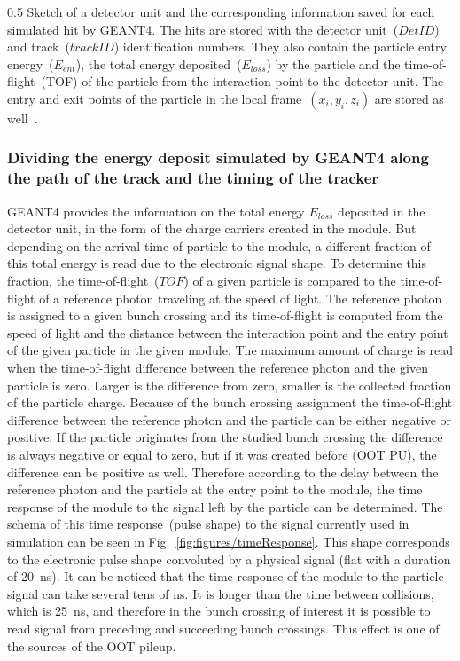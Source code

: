                  {0.5}       %
                 { Sketch of a detector unit and the corresponding information saved for each simulated hit by GEANT4. The hits are stored with the detector unit~($DetID$) and track~($trackID$) identification numbers. They also contain the particle entry energy~($E_{ent}$), the total energy deposited~($E_{loss}$) by the particle and the time-of-flight~(TOF) of the particle from the interaction point to the detector unit. The entry and exit points of the particle in the local frame~$(x_{i},y_{i},z_{i})$ are stored as well~\cite{website:simuBasics}. }

\subsubsection{Dividing the energy deposit simulated by GEANT4 along the path of the track and the timing of the tracker~\label{sec:divide}}

GEANT4 provides the information on the total energy $E_{loss}$ deposited in the detector unit, in the form of the charge carriers created in the module. But depending on the arrival time of particle to the module, a different fraction of this total energy is read due to the electronic signal shape. To determine this fraction, the time-of-flight~($TOF$) of a given particle is compared to the time-of-flight of a reference photon traveling at the speed of light. The reference photon is assigned to a given bunch crossing and its time-of-flight is computed from the speed of light and the distance between the interaction point and the entry point of the given particle in the given module. The maximum amount of charge is read when the time-of-flight difference between the reference photon and the given particle is zero. Larger is the difference from zero, smaller is the collected fraction of the particle charge. Because of the bunch crossing assignment the time-of-flight difference between the reference photon and the particle can be either negative or positive. If the particle originates from the studied bunch crossing the difference is always negative or equal to zero, but if it was created before (OOT PU), the difference can be positive as well. Therefore according to the delay between the reference photon and the particle at the entry point to the module, the time response of the module to the signal left by the particle can be determined. The schema of this time response~(pulse shape) to the signal currently used in simulation can be seen in Fig.~\ref{fig:figures/timeResponse}. This shape corresponds to the electronic pulse shape convoluted by a physical signal (flat with a duration  of 20~ns). It can be noticed that the time response of the module to the particle signal can take several tens of ns. It is longer than the time between collisions, which is 25~ns, and therefore in the bunch crossing of interest it is possible to read signal from preceding and succeeding bunch crossings. This effect is one of the sources of the OOT pileup.

